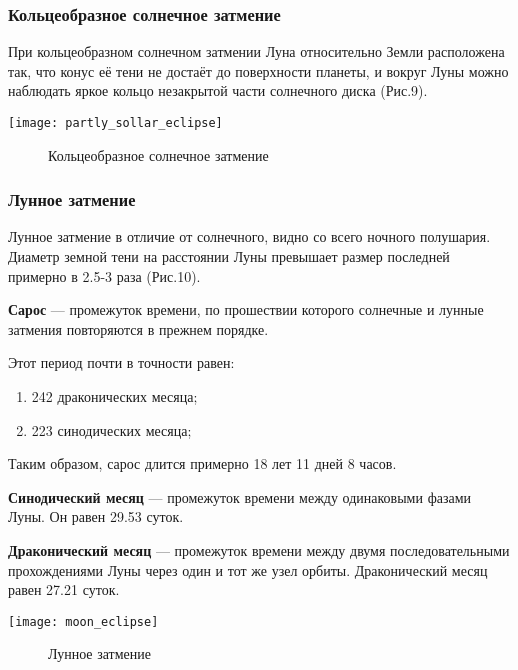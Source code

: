 \documentclass[10pt,a5paper]{article}
\begin{document}
\subsubsection{Кольцеобразное солнечное затмение}
При кольцеобразном солнечном затмении Луна относительно Земли расположена так, что конус её тени не достаёт до поверхности планеты, и вокруг Луны можно наблюдать яркое кольцо незакрытой части солнечного диска (Рис.9).
\begin{center}
\texttt{[image: partly\_sollar\_eclipse]}
\begin{figure}[h!]
\caption{Кольцеобразное солнечное затмение}
\end{figure}
\end{center}
\subsubsection{Лунное затмение}

Лунное затмение в отличие от солнечного, видно со всего ночного полушария. Диаметр земной тени на расстоянии Луны превышает размер последней примерно в 2.5-3 раза (Рис.10).

\textbf{Сарос} --- промежуток  времени, по прошествии которого солнечные и лунные затмения повторяются в прежнем порядке.

Этот период почти в точности равен:
\begin{enumerate}
\item 242 драконических месяца;
\item 223 синодических месяца;
\end{enumerate}

Таким образом, сарос длится примерно 18 лет 11 дней 8 часов.

\textbf{Синодический месяц} --- промежуток времени между одинаковыми фазами Луны. Он равен 29.53 суток.

\textbf{Драконический месяц} --- промежуток времени между двумя последовательными прохождениями Луны через один и тот же узел орбиты. Драконический месяц равен 27.21 суток.
\begin{center}
\texttt{[image: moon\_eclipse]}
\begin{figure}[h!]
\caption{Лунное затмение}
\end{figure}
\end{center}
\end{document}
